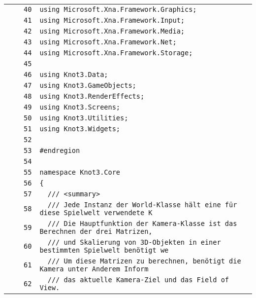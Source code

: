 \documentclass[a4paper,10pt]{article}
\begin{document}
\begin{longtable}[l]{lrrl}
\cellcolor{gray} &  & \verb~40~ & \verb~using Microsoft.Xna.Framework.Graphics;~\\
\cellcolor{gray} &  & \verb~41~ & \verb~using Microsoft.Xna.Framework.Input;~\\
\cellcolor{gray} &  & \verb~42~ & \verb~using Microsoft.Xna.Framework.Media;~\\
\cellcolor{gray} &  & \verb~43~ & \verb~using Microsoft.Xna.Framework.Net;~\\
\cellcolor{gray} &  & \verb~44~ & \verb~using Microsoft.Xna.Framework.Storage;~\\
\cellcolor{gray} &  & \verb~45~ & \verb~~\\
\cellcolor{gray} &  & \verb~46~ & \verb~using Knot3.Data;~\\
\cellcolor{gray} &  & \verb~47~ & \verb~using Knot3.GameObjects;~\\
\cellcolor{gray} &  & \verb~48~ & \verb~using Knot3.RenderEffects;~\\
\cellcolor{gray} &  & \verb~49~ & \verb~using Knot3.Screens;~\\
\cellcolor{gray} &  & \verb~50~ & \verb~using Knot3.Utilities;~\\
\cellcolor{gray} &  & \verb~51~ & \verb~using Knot3.Widgets;~\\
\cellcolor{gray} &  & \verb~52~ & \verb~~\\
\cellcolor{gray} &  & \verb~53~ & \verb~#endregion~\\
\cellcolor{gray} &  & \verb~54~ & \verb~~\\
\cellcolor{gray} &  & \verb~55~ & \verb~namespace Knot3.Core~\\
\cellcolor{gray} &  & \verb~56~ & \verb~{~\\
\cellcolor{gray} &  & \verb~57~ & \verb~  /// <summary>~\\
\cellcolor{gray} &  & \verb~58~ & \verb~  /// Jede Instanz der World-Klasse hält eine für diese Spielwelt verwendete K~\\
\cellcolor{gray} &  & \verb~59~ & \verb~  /// Die Hauptfunktion der Kamera-Klasse ist das Berechnen der drei Matrizen,~\\
\cellcolor{gray} &  & \verb~60~ & \verb~  /// und Skalierung von 3D-Objekten in einer bestimmten Spielwelt benötigt we~\\
\cellcolor{gray} &  & \verb~61~ & \verb~  /// Um diese Matrizen zu berechnen, benötigt die Kamera unter Anderem Inform~\\
\cellcolor{gray} &  & \verb~62~ & \verb~  /// das aktuelle Kamera-Ziel und das Field of View.~\\

\end{longtable}
\end{document}
